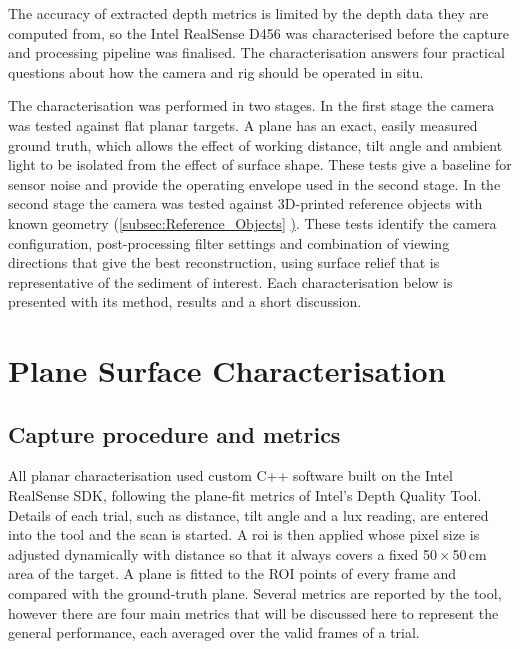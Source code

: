 
The accuracy of extracted depth metrics is limited by the depth data they are computed from, so the Intel RealSense D456 was characterised before the capture and processing pipeline was finalised. The characterisation answers four practical questions about how the camera and rig should be operated in situ.

The characterisation was performed in two stages. In the first stage the camera was tested against flat planar targets. A plane has an exact, easily measured ground truth, which allows the effect of working distance, tilt angle and ambient light to be isolated from the effect of surface shape. These tests give a baseline for sensor noise and provide the operating envelope used in the second stage. In the second stage the camera was tested against 3D-printed reference objects with known geometry (\autoref{subsec:Reference_Objects} \hyperref[Apendix:Reference_Objects]). These tests identify the camera configuration, post-processing filter settings and combination of viewing directions that give the best reconstruction, using surface relief that is representative of the sediment of interest. Each characterisation below is presented with its method, results and a short discussion.

\section{Plane Surface Characterisation}
\label{sec5.1:plane}
\subsection{Capture procedure and metrics}

All planar characterisation used custom C++ software built on the Intel RealSense SDK, following the plane-fit metrics of Intel's Depth Quality Tool. Details of each trial, such as distance, tilt angle and a lux reading, are entered into the tool and the scan is started. A \gls{roi} is then applied whose pixel size is adjusted dynamically with distance so that it always covers a fixed 50\,$\times$\,50\,cm area of the target. A plane is fitted to the ROI points of every frame and compared with the ground-truth plane. Several metrics are reported by the tool, however there are four main metrics that will be discussed here to represent the general performance, each averaged over the valid frames of a trial.

